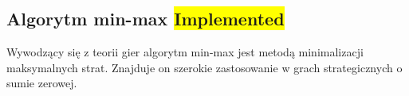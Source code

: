 \subsection{Algorytm min-max \colorbox{yellow}{Implemented}}
\label{subsec:algorytm-min-max}

Wywodzący się z teorii gier algorytm min-max jest metodą minimalizacji maksymalnych strat.
Znajduje on szerokie zastosowanie w grach strategicznych o sumie zerowej.
